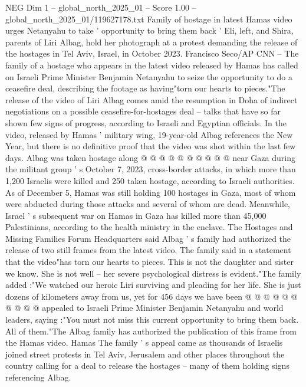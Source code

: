 \begin{textsample}{NEG Dim 1 – global\_north\_2025\_01 – Score 1.00 – global\_north\_2025\_01/119627178.txt}  \label{ex:f1_neg_060}
Family of hostage in latest Hamas video urges Netanyahu to take ' opportunity to bring them back ' Eli, left, and Shira, parents of Liri Albag, hold her photograph at a protest demanding the release of the hostages in Tel Aviv, Israel, in October 2023.
Francisco Seco/AP CNN -- The family of a hostage who appears in the latest video released by Hamas has called on Israeli Prime Minister Benjamin Netanyahu to seize the opportunity to do a ceasefire deal, describing the footage as having"torn our hearts to pieces."The release of the video of Liri Albag comes amid the resumption in Doha of indirect negotiations on a possible ceasefire-for-hostages deal -- talks that have so far shown few signs of progress, according to Israeli and Egyptian officials.
In the video, released by Hamas ' military wing, 19-year-old Albag references the New Year, but there is no definitive proof that the video was shot within the last few days.
Albag was taken hostage along @ @ @ @ @ @ @ @ @ @ near Gaza during the militant group ' s October 7, 2023, cross-border attacks, in which more than 1,200 Israelis were killed and 250 taken hostage, according to Israeli authorities.
As of December 5, Hamas was still holding 100 hostages in Gaza, most of whom were abducted during those attacks and several of whom are dead.
Meanwhile, Israel ' s subsequent war on Hamas in Gaza has killed more than 45,000 Palestinians, according to the health ministry in the enclave.
The Hostages and Missing Families Forum Headquarters said Albag ' s family had authorized the release of two still frames from the latest video.
The family said in a statement that the video"has torn our hearts to pieces.
This is not the daughter and sister we know.
She is not well -- her severe psychological distress is evident."The family added :"We watched our heroic Liri surviving and pleading for her life.
She is just dozens of kilometers away from us, yet for 456 days we have been @ @ @ @ @ @ @ @ @ @ appealed to Israeli Prime Minister Benjamin Netanyahu and world leaders, saying :"You must not miss this current opportunity to bring them back.
All of them."The Albag family has authorized the publication of this frame from the Hamas video.
Hamas The family ' s appeal came as thousands of Israelis joined street protests in Tel Aviv, Jerusalem and other places throughout the country calling for a deal to release the hostages -- many of them holding signs referencing Albag.

\end{textsample}
